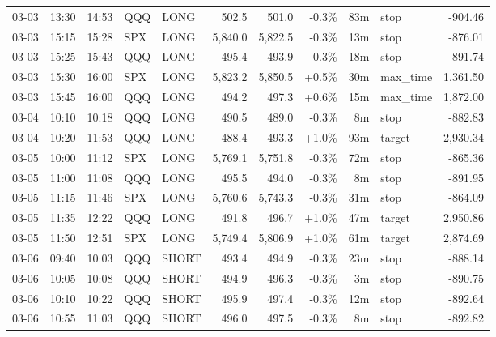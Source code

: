 \documentclass[11pt,a4paper,twoside]{article}
\begin{document}
\begin{center}
\begin{longtable}{>{\color{txtmain}}l l l l l r r r r >{\color{txtmain}}l r}
03-03 & 13:30 & 14:53 & QQQ & LONG & 502.5 & 501.0 & \textcolor{lossred}{-0.3\%} & 83m & stop & \textcolor{lossred}{-904.46} \\
03-03 & 15:15 & 15:28 & SPX & LONG & 5,840.0 & 5,822.5 & \textcolor{lossred}{-0.3\%} & 13m & stop & \textcolor{lossred}{-876.01} \\
03-03 & 15:25 & 15:43 & QQQ & LONG & 495.4 & 493.9 & \textcolor{lossred}{-0.3\%} & 18m & stop & \textcolor{lossred}{-891.74} \\
03-03 & 15:30 & 16:00 & SPX & LONG & 5,823.2 & 5,850.5 & \textcolor{wingreen}{+0.5\%} & 30m & max\_time & \textcolor{wingreen}{1,361.50} \\
03-03 & 15:45 & 16:00 & QQQ & LONG & 494.2 & 497.3 & \textcolor{wingreen}{+0.6\%} & 15m & max\_time & \textcolor{wingreen}{1,872.00} \\
03-04 & 10:10 & 10:18 & QQQ & LONG & 490.5 & 489.0 & \textcolor{lossred}{-0.3\%} & 8m & stop & \textcolor{lossred}{-882.83} \\
03-04 & 10:20 & 11:53 & QQQ & LONG & 488.4 & 493.3 & \textcolor{wingreen}{+1.0\%} & 93m & target & \textcolor{wingreen}{2,930.34} \\
03-05 & 10:00 & 11:12 & SPX & LONG & 5,769.1 & 5,751.8 & \textcolor{lossred}{-0.3\%} & 72m & stop & \textcolor{lossred}{-865.36} \\
03-05 & 11:00 & 11:08 & QQQ & LONG & 495.5 & 494.0 & \textcolor{lossred}{-0.3\%} & 8m & stop & \textcolor{lossred}{-891.95} \\
03-05 & 11:15 & 11:46 & SPX & LONG & 5,760.6 & 5,743.3 & \textcolor{lossred}{-0.3\%} & 31m & stop & \textcolor{lossred}{-864.09} \\
03-05 & 11:35 & 12:22 & QQQ & LONG & 491.8 & 496.7 & \textcolor{wingreen}{+1.0\%} & 47m & target & \textcolor{wingreen}{2,950.86} \\
03-05 & 11:50 & 12:51 & SPX & LONG & 5,749.4 & 5,806.9 & \textcolor{wingreen}{+1.0\%} & 61m & target & \textcolor{wingreen}{2,874.69} \\
03-06 & 09:40 & 10:03 & QQQ & SHORT & 493.4 & 494.9 & \textcolor{lossred}{-0.3\%} & 23m & stop & \textcolor{lossred}{-888.14} \\
03-06 & 10:05 & 10:08 & QQQ & SHORT & 494.9 & 496.3 & \textcolor{lossred}{-0.3\%} & 3m & stop & \textcolor{lossred}{-890.75} \\
03-06 & 10:10 & 10:22 & QQQ & SHORT & 495.9 & 497.4 & \textcolor{lossred}{-0.3\%} & 12m & stop & \textcolor{lossred}{-892.64} \\
03-06 & 10:55 & 11:03 & QQQ & SHORT & 496.0 & 497.5 & \textcolor{lossred}{-0.3\%} & 8m & stop & \textcolor{lossred}{-892.82} \\

\end{longtable}
\end{center}
\end{document}
